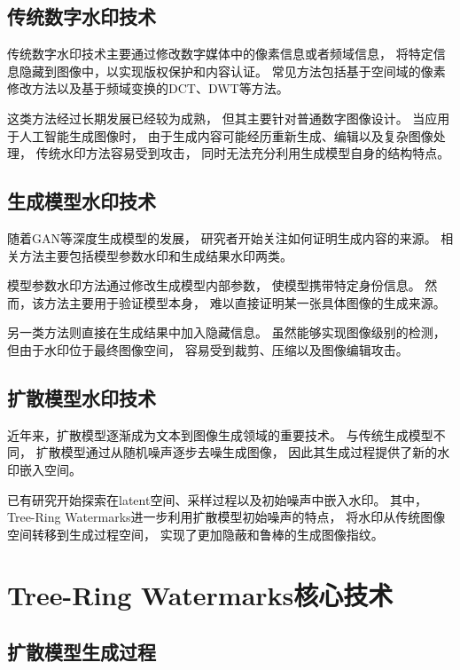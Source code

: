 \documentclass[12pt,a4paper]{article}
\begin{document}
\subsection{传统数字水印技术}

传统数字水印技术主要通过修改数字媒体中的像素信息或者频域信息，
将特定信息隐藏到图像中，以实现版权保护和内容认证。
常见方法包括基于空间域的像素修改方法以及基于频域变换的DCT、DWT等方法。

这类方法经过长期发展已经较为成熟，
但其主要针对普通数字图像设计。
当应用于人工智能生成图像时，
由于生成内容可能经历重新生成、编辑以及复杂图像处理，
传统水印方法容易受到攻击，
同时无法充分利用生成模型自身的结构特点。


\subsection{生成模型水印技术}

随着GAN等深度生成模型的发展，
研究者开始关注如何证明生成内容的来源。
相关方法主要包括模型参数水印和生成结果水印两类。

模型参数水印方法通过修改生成模型内部参数，
使模型携带特定身份信息。
然而，该方法主要用于验证模型本身，
难以直接证明某一张具体图像的生成来源。

另一类方法则直接在生成结果中加入隐藏信息。
虽然能够实现图像级别的检测，
但由于水印位于最终图像空间，
容易受到裁剪、压缩以及图像编辑攻击。


\subsection{扩散模型水印技术}

近年来，扩散模型逐渐成为文本到图像生成领域的重要技术。
与传统生成模型不同，
扩散模型通过从随机噪声逐步去噪生成图像，
因此其生成过程提供了新的水印嵌入空间。

已有研究开始探索在latent空间、采样过程以及初始噪声中嵌入水印。
其中，Tree-Ring Watermarks进一步利用扩散模型初始噪声的特点，
将水印从传统图像空间转移到生成过程空间，
实现了更加隐蔽和鲁棒的生成图像指纹。

\section{Tree-Ring Watermarks核心技术}

\subsection{扩散模型生成过程}
\end{document}
